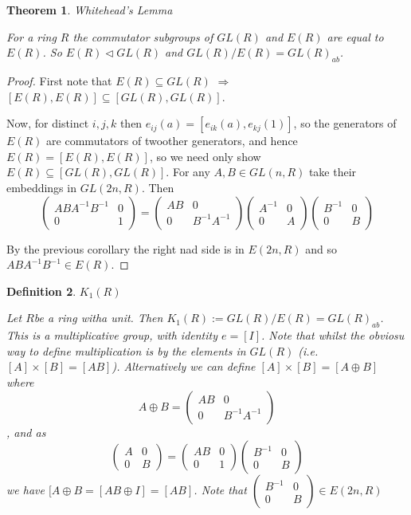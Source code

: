 \documentclass[a4paper,10pt]{article}
\newtheorem{thm}{Theorem}[subsection]
\newtheorem{defn}[thm]{Definition}
\begin{document}
\begin{thm}{Whitehead's Lemma}

For a ring $R$ the commutator subgroups of $GL(R)$ and $E(R)$ are equal to$E(R)$. So $E(R)\triangleleft GL(R)$ and $GL(R)/E(R)=GL(R)_{ab}$.
\end{thm}
\begin{proof}
First note that $E(R)\subseteq GL(R)$ $\Rightarrow$ $[E(R),E(R)]\subseteq [GL(R),GL(R)]$.

Now, for distinct $i,j,k$ then $e_{ij}(a)=[e_{ik}(a),e_{kj}(1)]$, so the generators of $E(R)$ are commutators of twoother generators, and hence $E(R)=[E(R),E(R)]$, so we need only show $E(R)\subseteq [GL(R),GL(R)]$.
For any $A,B\in GL(n,R)$ take their embeddings in $GL(2n,R)$. Then
$$\left(\begin{array}{cc} ABA^{-1}B^{-1} & 0 \\ 0 & 1 \end{array}\right)=
\left(\begin{array}{cc} AB & 0 \\ 0 & B^{-1}A^{-1} \end{array}\right)
\left(\begin{array}{cc} A^{-1} & 0 \\ 0 & A \end{array}\right)
\left(\begin{array}{cc} B^{-1} & 0 \\ 0 & B \end{array}\right)$$

By the previous corollary the right nad side is in $E(2n,R)$ and so $ABA^{-1}B^{-1}\in E(R)$.
\end{proof}

\begin{defn}{$K_{1}(R)$}

Let $R$be a ring witha unit. Then $K_{1}(R):= GL(R)/E(R)=GL(R)_{ab}$. This is a multiplicative group, with identity $e=[I]$. Note that whilst the obviosu way to define multiplication is by the elements in $GL(R)$ (i.e. $[A]\times [B]=[AB]$). Alternatively we can define $[A]\times [B]=[A\oplus B]$ where
$$A\oplus B= \left(\begin{array}{cc} AB & 0 \\ 0 & B^{-1}A^{-1} \end{array}\right)$$, and as
$$\left(\begin{array}{cc} A & 0 \\ 0 & B \end{array}\right)= \left(\begin{array}{cc} AB & 0 \\ 0 & 1 \end{array}\right)  \left(\begin{array}{cc} B^{-1} & 0 \\ 0 & B \end{array}\right)$$ we have $[A\oplus B=[AB\oplus I]=[AB]$. Note that $\left(\begin{array}{cc} B^{-1} & 0 \\ 0 & B \end{array}\right)\in E(2n,R)$

\end{defn}
\end{document}
